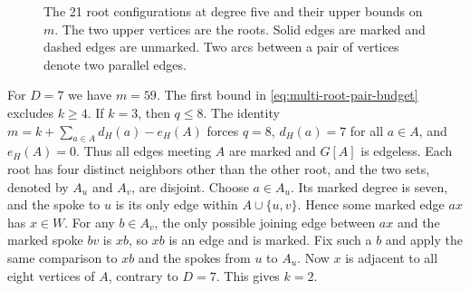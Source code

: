 \documentclass[preprint,11pt,numbers]{elsarticle-arxiv}
\makeatletter
\newcommand{\FloatBarrier}{\par\ifx\@deferlist\@empty\else\clearpage\fi}}
\numberwithin{equation}{section}
\theoremstyle{definition}
\makeatother
\begin{document}
\begin{figure}[htbp]
\caption{The 21 root configurations at degree five and their upper bounds on $m$. The two upper vertices are the roots. Solid edges are marked and dashed edges are unmarked. Two arcs between a pair of vertices denote two parallel edges.}
\label{fig:finite-five-spokes}
\end{figure}
\relax\space%
\FloatBarrier

For $D=7$ we have $m=59$. The first bound in
\eqref{eq:multi-root-pair-budget} excludes $k\geq4$. If
$k=3$, then $q\leq8$. The identity
$m=k+\sum_{a\in A}d_H(a)-e_H(A)$ forces $q=8$,
$d_H(a)=7$ for all $a\in A$, and $e_H(A)=0$. Thus all edges
meeting $A$ are marked and $G[A]$ is edgeless. Each root has
four distinct neighbors other than the other root, and the two
sets, denoted by $A_u$ and $A_v$, are disjoint. Choose
$a\in A_u$. Its marked degree is seven, and the spoke to
$u$ is its only edge within $A\cup\{u,v\}$. Hence some
marked edge $ax$ has $x\in W$. For any $b\in A_v$, the
only possible joining edge between $ax$ and the marked
spoke $bv$ is $xb$, so $xb$ is an edge and is marked.
Fix such a $b$ and apply the same comparison to $xb$ and the
spokes from $u$ to $A_u$. Now $x$ is adjacent to all eight
vertices of $A$, contrary to $D=7$. This gives $k=2$.
\end{document}

